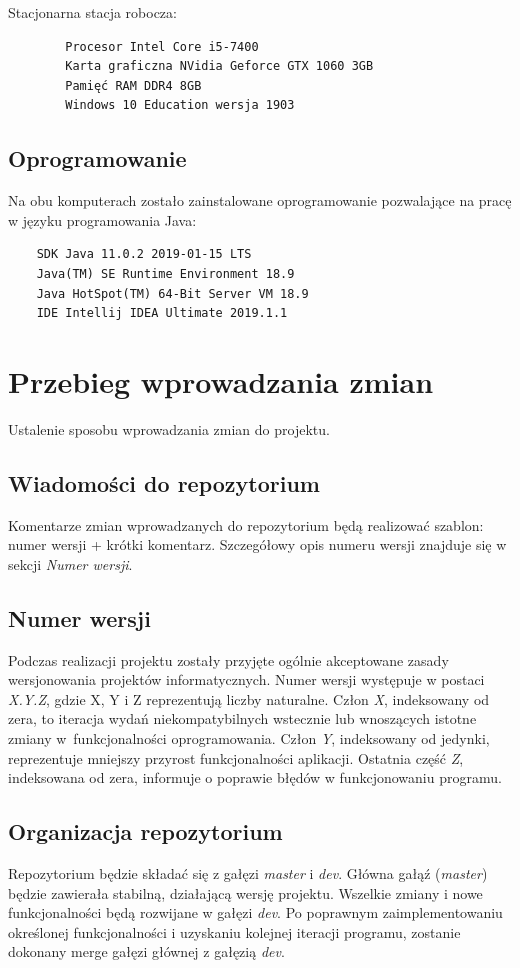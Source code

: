 \documentclass{article}
\begin{document}
    Stacjonarna stacja robocza:
\vspace{-8pt}        
\begin{verbatim}
        Procesor Intel Core i5-7400
        Karta graficzna NVidia Geforce GTX 1060 3GB
        Pamięć RAM DDR4 8GB
        Windows 10 Education wersja 1903
\end{verbatim}

\subsection{Oprogramowanie}

Na obu komputerach zostało zainstalowane oprogramowanie pozwalające na pracę w języku programowania Java:

\begin{verbatim}
    SDK Java 11.0.2 2019-01-15 LTS
    Java(TM) SE Runtime Environment 18.9
    Java HotSpot(TM) 64-Bit Server VM 18.9
    IDE Intellij IDEA Ultimate 2019.1.1 
\end{verbatim}

\section{Przebieg wprowadzania zmian}
Ustalenie sposobu wprowadzania zmian do projektu.

\subsection{Wiadomości do repozytorium}
Komentarze zmian wprowadzanych do repozytorium będą realizować szablon: numer wersji + krótki komentarz. Szczegółowy opis numeru wersji znajduje się w sekcji \textit{Numer wersji}.

\subsection{Numer wersji}
Podczas realizacji projektu zostały przyjęte ogólnie akceptowane zasady wersjonowania projektów informatycznych. Numer wersji występuje w postaci \textit{X.Y.Z}, gdzie X, Y i Z reprezentują liczby naturalne. Człon \textit{X}, indeksowany od zera, to iteracja wydań niekompatybilnych wstecznie lub wnoszących istotne zmiany w~funkcjonalności oprogramowania. Człon \textit{Y}, indeksowany od jedynki, reprezentuje mniejszy przyrost funkcjonalności aplikacji. Ostatnia część \textit{Z}, indeksowana od zera, informuje o poprawie błędów w funkcjonowaniu programu.

\subsection{Organizacja repozytorium}
Repozytorium będzie składać się z gałęzi \textit{master} i \textit{dev}. Główna gałąź (\textit{master}) będzie zawierała stabilną, działającą wersję projektu. Wszelkie zmiany i nowe funkcjonalności będą rozwijane w gałęzi \textit{dev}. Po poprawnym zaimplementowaniu określonej funkcjonalności i uzyskaniu kolejnej iteracji programu, zostanie dokonany merge gałęzi głównej z gałęzią \textit{dev}.
\end{document}
